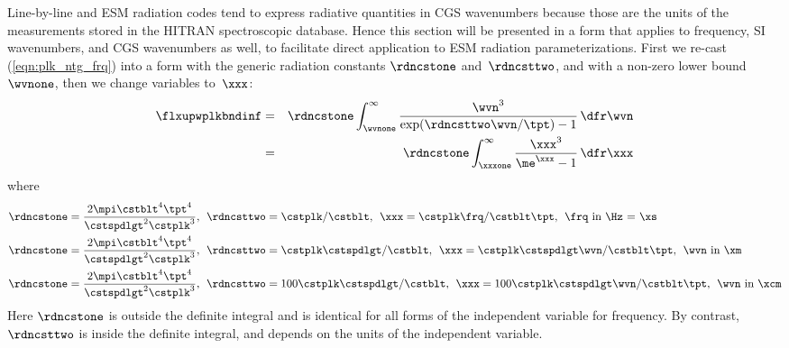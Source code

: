 \documentclass[12pt]{article}
\begin{document}
Line-by-line and ESM radiation codes tend to express radiative
quantities in CGS wavenumbers because those are the units of the
measurements stored in the HITRAN spectroscopic database. 
Hence this section will be presented in a form that applies to
frequency, SI wavenumbers, and CGS wavenumbers as well, to
facilitate direct application to ESM radiation parameterizations. 
First we re-cast (\ref{eqn:plk_ntg_frq}) into a form with the
generic radiation constants $\rdncstone$ and~$\rdncsttwo$, and
with a non-zero lower bound~$\wvnone$, then we change variables
to~$\xxx$:
\begin{eqnarray}
\label{eqn:plk_ntg_wvn}
\flxupwplkbndinf
& = & \rdncstone
\int_{\wvnone}^{\infty} 
\frac{\wvn^{3}}{\exp(\rdncsttwo\wvn/\tpt) - 1} \,\dfr\wvn \nonumber \\
\label{eqn:plk_ntg_xxx}
& = & \rdncstone
\int_{\xxxone}^{\infty} 
\frac{\xxx^{3}}{\me^{\xxx} - 1} \,\dfr\xxx
\end{eqnarray}
where
\begin{subequations}
\label{eqn:rdn_cst_dfn}
\begin{align}
\label{eqn:rdn_cst_one_frq_dfn}
\rdncstone & = \frac{2 \mpi \cstblt^{4} \tpt^{4} }{\cstspdlgt^{2} \cstplk^{3}}, \mkern8mu
\rdncsttwo = \cstplk / \cstblt, \mkern8mu
      \xxx = \cstplk \frq / \cstblt \tpt,
               \mkern8mu \mbox{\frq\ in \Hz\ = \xs} \\
\label{eqn:rdn_cst_one_wvn_dfn}
\rdncstone & = \frac{2 \mpi \cstblt^{4} \tpt^{4} }{\cstspdlgt^{2} \cstplk^{3}}, \mkern8mu
\rdncsttwo = \cstplk \cstspdlgt / \cstblt, \mkern8mu
      \xxx = \cstplk \cstspdlgt \wvn / \cstblt \tpt,
               \mkern8mu \mbox{\wvn\ in \xm} \\
\label{eqn:rdn_cst_one_wvn_cgs_dfn}
\rdncstone & = \frac{2 \mpi \cstblt^{4} \tpt^{4} }{\cstspdlgt^{2} \cstplk^{3}}, \mkern8mu
\rdncsttwo = 100 \cstplk \cstspdlgt / \cstblt, \mkern8mu
      \xxx = 100 \cstplk \cstspdlgt \wvn / \cstblt \tpt,
               \mkern8mu \mbox{\wvn\ in \xcm}
\end{align}
\end{subequations}
Here $\rdncstone$ is outside the definite integral and is identical for all
forms of the independent variable for frequency. 
By contrast, $\rdncsttwo$ is inside the definite integral, and depends on the units 
of the independent variable.
\end{document}
